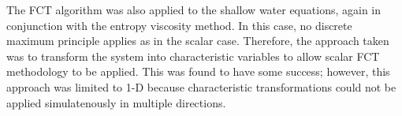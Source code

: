 The FCT algorithm was also applied to the shallow water equations,
again in conjunction with the entropy viscosity method. In this case,
no discrete maximum principle applies as in the scalar case. Therefore,
the approach taken was to transform the system into characteristic variables
to allow scalar FCT methodology to be applied. This was found to have some
success; however, this approach was limited to 1-D because characteristic
transformations could not be applied simulatenously in multiple directions.
